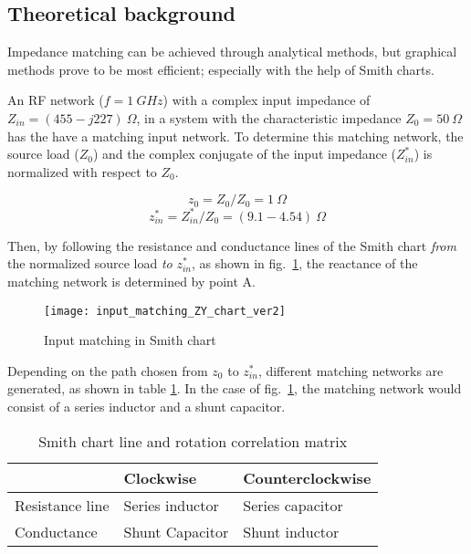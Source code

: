 \documentclass[report.tex]{subfiles}
\begin{document}
\subsection{Theoretical background}
\label{seq:lab2 background}

Impedance matching can be achieved through analytical methods, but graphical methods prove to be most efficient; especially  with the help of Smith charts.

An RF network ($f=1~GHz$) with a complex input impedance of $Z_{in}=(455-j227)~\Omega$, in a system with the characteristic impedance $Z_0=50 ~\Omega$ has the have a matching input network. To determine this matching network, the source load ($Z_0$) and the complex conjugate of the input impedance ($Z_{in}^*$) is normalized with respect to $Z_0$.

\begin{equation*}
    z_0=Z_0/Z_0 = 1~\Omega
\end{equation*}
\begin{equation*}
    z_{in}^*=Z_{in}^*/Z_0=(9.1-4.54)~\Omega
\end{equation*}

Then, by following the resistance and conductance lines of the Smith chart \emph{from} the normalized source load \emph{to} $z_{in}^*$, as shown in fig.~\ref{fig:input_matching_smith_chart}, the reactance of the matching network is determined by point A.

\begin{figure}[h]
    \centering
    \texttt{[image: input\_matching\_ZY\_chart\_ver2]}
    \caption{Input matching in Smith chart}
    \label{fig:input_matching_smith_chart}
\end{figure}

Depending on the path chosen from $z_0$ to $z_{in}^*$, different matching networks are generated, as shown in table \ref{tab:relations}. In the case of fig.~\ref{fig:input_matching_smith_chart}, the matching network would consist of a series inductor and a shunt capacitor.

\begin{table}[h]
    \centering
    \caption{Smith chart line and rotation correlation matrix}
    \label{tab:relations}
    \begin{tabular}{l | l l}
                        & Clockwise         & Counterclockwise  \\
        \hline
        Resistance line & Series inductor   & Series capacitor  \\
        Conductance     & Shunt Capacitor   & Shunt inductor    \\
    \end{tabular}
\end{table}
\end{document}
